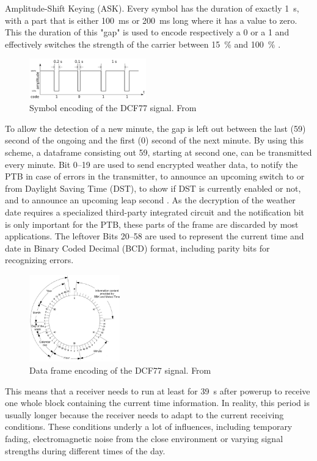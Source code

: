 \documentclass[conference]{IEEEtran}
\begin{document}
Amplitude-Shift Keying (ASK). Every symbol has the duration of exactly \SI{1}{\second}, with a part that is either \SI{100}{\milli\second} or \SI{200}{\milli\second}
long where it has a value to zero.
This the duration of this "gap" is used to encode respectively a 0 or a 1 and effectively switches the strength of the carrier between \SI{15}{\percent} and \SI{100}{\percent} \cite{b5}.
\begin{figure}[htbp]
    \centerline{\includegraphics[width=0.45\textwidth]{img/dcf77_symbol_encoding.png}}
    \caption{Symbol encoding of the DCF77 signal. From \cite{b1}}
    \label{fig:dcf77_symbol_encoding}
\end{figure}
\FloatBarrier\noindent
To allow the detection of a new minute, the gap is left out between the last (59) second of the ongoing and the first (0) second of the next minute.
By using this scheme, a dataframe consisting out \SI{59}{\Bit}, starting at second one, can be transmitted every minute.
Bit \SIrange{0}{19}{} are used to send encrypted weather data, to notify the PTB in case of errors in the transmitter, to announce an upcoming
switch to or from Daylight Saving Time (DST), to show if DST is currently enabled or not, and to announce an upcoming leap second \cite{b5}.
As the decryption of the weather date requires a specialized third-party integrated circuit and the notification bit is only important for the PTB, these parts
of the frame are discarded by most applications.
The leftover Bits \SIrange{20}{58}{} are used to represent the current time and date in Binary Coded Decimal (BCD) format, including parity bits for recognizing errors.
\begin{figure}[htbp]
    \centerline{\includegraphics[width=0.35\textwidth]{img/dcf77_frame_encoding.jpg}}
    \caption{Data frame encoding of the DCF77 signal. From \cite{b5}}
    \label{fig:dcf77_data_encoding}
\end{figure}
\FloatBarrier\noindent
This means that a receiver needs to run at least for \SI{39}{\second} after powerup to receive one whole block containing the current time information.
In reality, this period is usually longer because the receiver needs to adapt to the current receiving conditions. 
These conditions underly a lot of influences, including temporary fading, electromagnetic noise from the close environment or varying signal strengths
during different times of the day.
\end{document}
